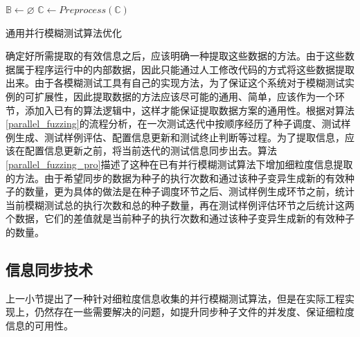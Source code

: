 \documentclass[master]{thesis-uestc}
\begin{document}
\begin{algorithm}[!htbp]
    $\mathbb{B} \leftarrow \varnothing$ \;
    $\mathbb{C} \leftarrow Preprocess(\mathbb{C})$\;
    \caption{通用并行模糊测试算法优化}
    \label{parallel_fuzzing_pro}
\end{algorithm}

确定好所需提取的有效信息之后，应该明确一种提取这些数据的方法。由于这些数据属于程序运行中的内部数据，因此只能通过人工修改代码的方式将这些数据提取出来。由于各模糊测试工具有自己的实现方法，为了保证这个系统对于模糊测试实例的可扩展性，因此提取数据的方法应该尽可能的通用、简单，应该作为一个环节，添加入已有的算法逻辑中，这样才能保证提取数据方案的通用性。根据对算法\ref{parallel_fuzzing}的流程分析，在一次测试迭代中按顺序经历了种子调度、测试样例生成、测试样例评估、配置信息更新和测试终止判断等过程。为了提取信息，应该在配置信息更新之前，将当前迭代的测试信息同步出去。算法\ref{parallel_fuzzing_pro}描述了这种在已有并行模糊测试算法下增加细粒度信息提取的方法。由于希望同步的数据为种子的执行次数和通过该种子变异生成新的有效种子的数量，更为具体的做法是在种子调度环节之后、测试样例生成环节之前，统计当前模糊测试总的执行次数和总的种子数量，再在测试样例评估环节之后统计这两个数据，它们的差值就是当前种子的执行次数和通过该种子变异生成新的有效种子的数量。

\subsection{信息同步技术}

上一小节提出了一种针对细粒度信息收集的并行模糊测试算法，但是在实际工程实现上，仍然存在一些需要解决的问题，如提升同步种子文件的并发度、保证细粒度信息的可用性。
\end{document}
